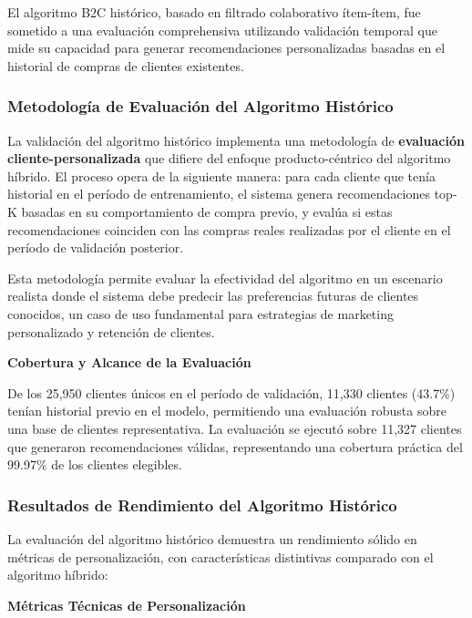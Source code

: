 \documentclass[twocolumn]{article}
\begin{document}
El algoritmo B2C histórico, basado en filtrado colaborativo ítem-ítem, fue sometido a una evaluación comprehensiva utilizando validación temporal que mide su capacidad para generar recomendaciones personalizadas basadas en el historial de compras de clientes existentes.

\subsubsection{Metodología de Evaluación del Algoritmo Histórico}

La validación del algoritmo histórico implementa una metodología de \textbf{evaluación cliente-personalizada} que difiere del enfoque producto-céntrico del algoritmo híbrido. El proceso opera de la siguiente manera: para cada cliente que tenía historial en el período de entrenamiento, el sistema genera recomendaciones top-K basadas en su comportamiento de compra previo, y evalúa si estas recomendaciones coinciden con las compras reales realizadas por el cliente en el período de validación posterior.

Esta metodología permite evaluar la efectividad del algoritmo en un escenario realista donde el sistema debe predecir las preferencias futuras de clientes conocidos, un caso de uso fundamental para estrategias de marketing personalizado y retención de clientes.

\textbf{Cobertura y Alcance de la Evaluación}

De los 25,950 clientes únicos en el período de validación, 11,330 clientes (43.7\%) tenían historial previo en el modelo, permitiendo una evaluación robusta sobre una base de clientes representativa. La evaluación se ejecutó sobre 11,327 clientes que generaron recomendaciones válidas, representando una cobertura práctica del 99.97\% de los clientes elegibles.

\subsubsection{Resultados de Rendimiento del Algoritmo Histórico}

La evaluación del algoritmo histórico demuestra un rendimiento sólido en métricas de personalización, con características distintivas comparado con el algoritmo híbrido:

\textbf{Métricas Técnicas de Personalización}
\end{document}
